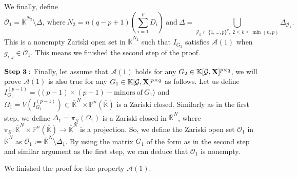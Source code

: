 \documentclass[11pt]{article}
\numberwithin{Property}{section}
\numberwithin{Theorem}{section}
\numberwithin{Proposition}{section}
\numberwithin{Lemma}{section}
\numberwithin{Corollary}{section}
\numberwithin{Definition}{section}
\numberwithin{Remark}{section}
\numberwithin{Conjecture}{section}
\numberwithin{Problem}{section}
\numberwithin{Example}{section}
\numberwithin{Claim}{section}
\renewcommand{\leq}{\leqslant}
\def\bar{\overline}
\newcommand{\field}{\mathbb{K}} %
\newcommand{\mat}[1]{\mathbf{\MakeUppercase{#1}}} %
\begin{document}
We finally, define \[\bar{\mathcal{O}}_1 = \bar{\field}^{N_2} \setminus \Delta, \ \mathrm{where}\  N_2 = n(q-p+1)(\sum_{i=1}^pD_i) \ \mathrm{and} \ \Delta = \bigcup_{\mathcal{J}_k \subset\{1, \ldots, p\}^k, \ 2 \leq k \leq \min(n,p)}\Delta_{\mathcal{J}_k}.\]
This is a nonempty Zariski open set in $\bar{\field}^{N_2}$ such that $I_{G_2}$ satisfies $\mathcal{A}(1)$ when $g_{i,j} \in \bar{\mathcal{O}}_1$. This means we finished the second step of the proof. 

$\bf{Step \ 3:}$ Finally, let assume that $\mathcal{A}(1)$ holds for any $G_2 \in \field[\mathcal{G}, \mat{X}]^{p \times q}$, we will prove $\mathcal{A}(1)$ is also true for any $G_1 \in \field[\mathcal{G}, \mat{X}]^{p \times q}$ as follows. Let us define $I_{G_1}^{(p-1)} = \langle (p-1) \times (p-1) - \mathrm{minors \ of} \ G_1 \rangle$ and $\Omega_1 = V(I_{G_1}^{(p-1)}) \subset \bar{\field}^{N} \times \mathbb{P}^n(\bar{\field})$ is a Zariski closed. Similarly as in the first step, we define $\Delta_1 = \pi_{\mathcal{G}}(\Omega_1)$ is a Zariski closed in $\bar{\field}^{N}$, where $\pi_{\mathcal{G}} : \bar{\field}^{N} \times \mathbb{P}^n(\bar{\field}) \to \bar{\field}^{N}$ is a projection. So, we define the Zariski open set $\mathcal{O}_1$ in $\bar{\field}^{N}$ as $\mathcal{O}_1 := \bar{\field}^{N} \setminus \Delta_1$. By using the matrix $G_1$ of the form as in the second step and similar argument as the first step, we can deduce that $\mathcal{O}_1$ is nonempty. 

We finished the proof for the property $\mathcal{A}(1)$. 
\end{document}
